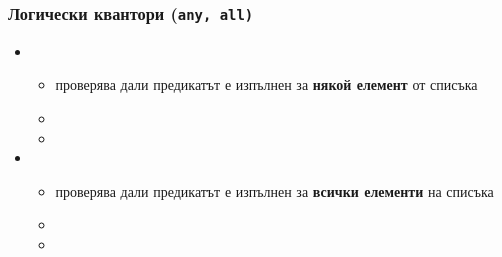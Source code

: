\documentclass{beamer}
\begin{document}
\begin{frame}
  \frametitle{Логически квантори (\tt{any}, \tt{all})}

  \begin{itemize}[<+->]
  \item {}
    \begin{itemize}
    \item проверява дали предикатът е изпълнен за \textbf{някой елемент} от списъка
    \item {}
    \item {}
    \end{itemize}
  \item {}
    \begin{itemize}
    \item проверява дали предикатът е изпълнен за \textbf{всички елементи} на списъка
    \item {}
    \item {}
    \end{itemize}
  \end{itemize}
\end{frame}
\end{document}
